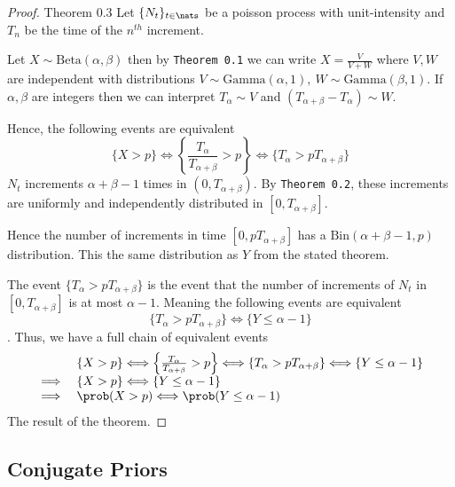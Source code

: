 \documentclass[11pt,a4paper]{article}
\begin{document}
  \begin{proof}{Theorem 0.3}
    Let $\{N_t\}_{t\in\nats}$ be a poisson process with unit-intensity and $T_n$ be the time of the $n^{th}$ increment.
    \par Let $X\sim\text{Beta}(\alpha,\beta)$ then by \texttt{Theorem 0.1} we can write $X=\frac{V}{V+W}$ where $V,W$ are independent with distributions $V\sim\text{Gamma}(\alpha,1),\ W\sim\text{Gamma}(\beta,1)$. If $\alpha,\beta$ are integers then we can interpret $T_\alpha\sim V$ and $(T_{\alpha+\beta}-T_\alpha)\sim W$.
    \par Hence, the following events are equivalent
    \[ \{X>p\}\Longleftrightarrow\left\{\frac{T_\alpha}{T_{\alpha+\beta}}>p\right\}\Longleftrightarrow\{T_\alpha>pT_{\alpha+\beta}\} \]
    $N_t$ increments $\alpha+\beta-1$ times in $(0,T_{\alpha+\beta})$. By \texttt{Theorem 0.2}, these increments are uniformly and independently distributed in $[0,T_{\alpha+\beta}]$.
    \par Hence the number of increments in time $[0,pT_{\alpha+\beta}]$ has a $\text{Bin}(\alpha+\beta-1,p)$ distribution. This the same distribution as $Y$ from the stated theorem.
    \par The event $\{T_\alpha>pT_{\alpha+\beta}\}$ is the event that the number of increments of $N_t$ in $[0,T_{\alpha+\beta}]$ is at most $\alpha-1$. Meaning the following events are equivalent
    \[ \{T_\alpha>pT_{\alpha+\beta}\}\Longleftrightarrow\{Y\leq \alpha-1\} \].
    Thus, we have a full chain of equivalent events
    \[\begin{array}{rl}
    &\{X>p\}\Longleftrightarrow\left\{\frac{T_\alpha}{T_{\alpha+\beta}}>p\right\}\Longleftrightarrow\{T_\alpha>pT_{\alpha+\beta}\}\Longleftrightarrow\{Y\leq \alpha-1\}\\
    \implies&\{X>p\}\Longleftrightarrow\{Y\leq \alpha-1\}\\
    \implies&\prob(X>p)\Longleftrightarrow\prob(Y\leq\alpha-1)
    \end{array}\]
    The result of the theorem.
    \proved
  \end{proof}

\subsection{Conjugate Priors}
\end{document}
